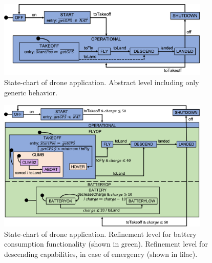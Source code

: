 \begin{figure}[]
	\vspace{-.4cm}
	\centering
	\includegraphics[width=0.90\textwidth, trim=0 40 0 0]{figures/Picture1.png}
	\caption{State-chart of drone application. Abstract level including only generic behavior. }
	\label{fig:drone1}
	\vspace{-.4cm}
\end{figure} 



\begin{figure}[]
	\centering
	\includegraphics[width=0.90\textwidth, trim=0 30 0 0]{figures/Picture5.png}
	\caption{State-chart of drone application. 
	Refinement level for battery consumption functionality (shown in green).
	Refinement level for descending capabilities, in case of emergency (shown in lilac).}
	\label{fig:drone4}
\end{figure} 

